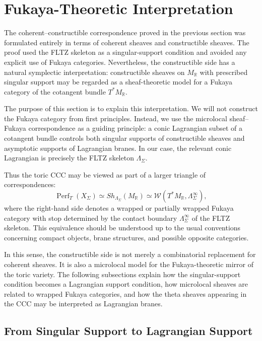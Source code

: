 \section{Fukaya-Theoretic Interpretation}
The coherent--constructible correspondence proved in the previous section was
formulated entirely in terms of coherent sheaves and constructible sheaves.
The proof used the FLTZ skeleton as a singular-support condition and avoided
any explicit use of Fukaya categories. Nevertheless, the constructible side
has a natural symplectic interpretation: constructible sheaves on
\(M_{\mathbb R}\) with prescribed singular support may be regarded as a
sheaf-theoretic model for a Fukaya category of the cotangent bundle
\(T^*M_{\mathbb R}\).

The purpose of this section is to explain this interpretation. We will not
construct the Fukaya category from first principles. Instead, we use the
microlocal sheaf--Fukaya correspondence as a guiding principle: a conic
Lagrangian subset of a cotangent bundle controls both singular supports of
constructible sheaves and asymptotic supports of Lagrangian branes. In our
case, the relevant conic Lagrangian is precisely the FLTZ skeleton
\(\Lambda_\Sigma\).

Thus the toric CCC may be viewed as part of a larger triangle of
correspondences:
\[
\operatorname{Perf}_T(X_\Sigma)
\simeq
Sh_{\Lambda_\Sigma}(M_{\mathbb R})
\simeq
\mathcal W(T^*M_{\mathbb R},\Lambda_\Sigma^\infty),
\]
where the right-hand side denotes a wrapped or partially wrapped Fukaya
category with stop determined by the contact boundary
\(\Lambda_\Sigma^\infty\) of the FLTZ skeleton. This equivalence should be
understood up to the usual conventions concerning compact objects, brane
structures, and possible opposite categories.

In this sense, the constructible side is not merely a combinatorial
replacement for coherent sheaves. It is also a microlocal model for the
Fukaya-theoretic mirror of the toric variety. The following subsections
explain how the singular-support condition becomes a Lagrangian support
condition, how microlocal sheaves are related to wrapped Fukaya categories,
and how the theta sheaves appearing in the CCC may be interpreted as
Lagrangian branes.


\subsection{From Singular Support to Lagrangian Support}

